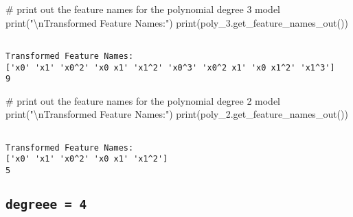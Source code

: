 \documentclass[
  letterpaper,
  DIV=11,
  numbers=noendperiod]{scrreprt}
\newenvironment{Shaded}{\begin{snugshade}}{\end{snugshade}}
\newcommand{\BuiltInTok}[1]{\textcolor[rgb]{0.00,0.23,0.31}{#1}}
\newcommand{\CharTok}[1]{\textcolor[rgb]{0.13,0.47,0.30}{#1}}
\newcommand{\CommentTok}[1]{\textcolor[rgb]{0.37,0.37,0.37}{#1}}
\newcommand{\NormalTok}[1]{\textcolor[rgb]{0.00,0.23,0.31}{#1}}
\newcommand{\StringTok}[1]{\textcolor[rgb]{0.13,0.47,0.30}{#1}}
\begin{document}
\begin{Shaded}
\begin{Highlighting}[]
\CommentTok{\# print out the feature names for the polynomial degree 3 model}
\BuiltInTok{print}\NormalTok{(}\StringTok{"}\CharTok{\textbackslash{}n}\StringTok{Transformed Feature Names:"}\NormalTok{)}
\BuiltInTok{print}\NormalTok{(poly\_3.get\_feature\_names\_out())}
\end{Highlighting}
\end{Shaded}

\begin{verbatim}

Transformed Feature Names:
['x0' 'x1' 'x0^2' 'x0 x1' 'x1^2' 'x0^3' 'x0^2 x1' 'x0 x1^2' 'x1^3']
9
\end{verbatim}

\begin{Shaded}
\begin{Highlighting}[]
\CommentTok{\# print out the feature names for the polynomial degree 2 model}
\BuiltInTok{print}\NormalTok{(}\StringTok{"}\CharTok{\textbackslash{}n}\StringTok{Transformed Feature Names:"}\NormalTok{)}
\BuiltInTok{print}\NormalTok{(poly\_2.get\_feature\_names\_out())}
\end{Highlighting}
\end{Shaded}

\begin{verbatim}

Transformed Feature Names:
['x0' 'x1' 'x0^2' 'x0 x1' 'x1^2']
5
\end{verbatim}

\subsection{\texorpdfstring{\texttt{degreee\ =\ 4}}{degreee = 4}}\label{degreee-4}
\end{document}

